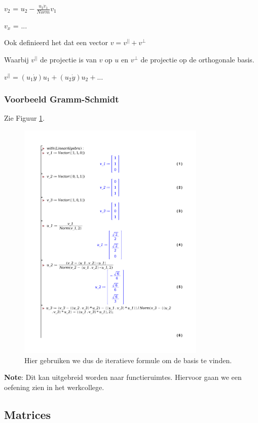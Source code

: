 \documentclass[a4paper]{report}
\begin{document}
$v_2$ = $u_2 - \frac{u_2 \dot v_1}{Norm} v_1$

$v_x$ = ...

Ook definieerd het dat een vector $v = v^{||} + v^{\perp}$

Waarbij $v^{||}$ de projectie is van $v$ op $u$ en $v^{\perp}$ de projectie op de orthogonale basis.

$v^{||} = (u_1 \dot y) u_1 + (u_2 \dot y) u_2 + ...$

\subsubsection{Voorbeeld Gramm-Schmidt}

Zie Figuur \ref{fig:gramm_schmidt}.


\begin{figure}[htbp!]
	\centering
	\includegraphics[width=0.8\textwidth]{./gram.pdf}
	\caption{Hier gebruiken we dus de iteratieve formule om de basis te vinden.}
	\label{fig:gramm_schmidt}
\end{figure}

\textbf{Note}: Dit kan uitgebreid worden naar functieruimtes. Hiervoor gaan we een oefening zien in het werkcollege.

\subsection{Matrices}
\end{document}
